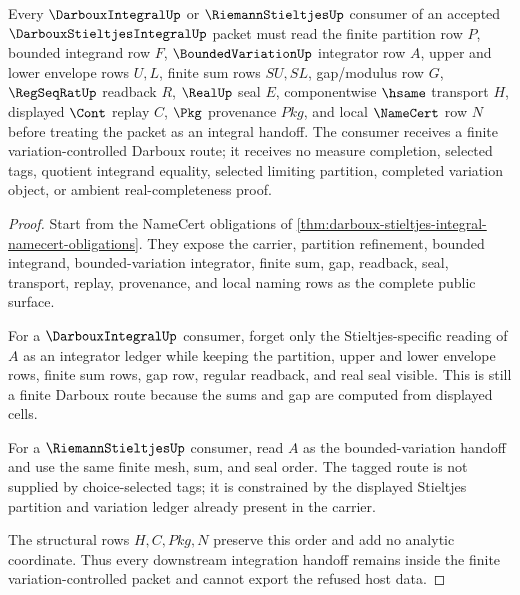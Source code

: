 \begin{theorem}
\label{thm:darboux-stieltjes-integral-variation-handoff}
Every $\DarbouxIntegralUp$ or $\RiemannStieltjesUp$ consumer of an accepted $\DarbouxStieltjesIntegralUp$ packet must read the finite partition row $P$, bounded integrand row $F$, $\BoundedVariationUp$ integrator row $A$, upper and lower envelope rows $U,L$, finite sum rows $SU,SL$, gap/modulus row $G$, $\RegSeqRatUp$ readback $R$, $\RealUp$ seal $E$, componentwise $\hsame$ transport $H$, displayed $\Cont$ replay $C$, $\Pkg$ provenance $Pkg$, and local $\NameCert$ row $N$ before treating the packet as an integral handoff. The consumer receives a finite variation-controlled Darboux route; it receives no measure completion, selected tags, quotient integrand equality, selected limiting partition, completed variation object, or ambient real-completeness proof.
\end{theorem}
\begin{proof}
Start from the NameCert obligations of \autoref{thm:darboux-stieltjes-integral-namecert-obligations}. They expose the carrier, partition refinement, bounded integrand, bounded-variation integrator, finite sum, gap, readback, seal, transport, replay, provenance, and local naming rows as the complete public surface.

For a $\DarbouxIntegralUp$ consumer, forget only the Stieltjes-specific reading of $A$ as an integrator ledger while keeping the partition, upper and lower envelope rows, finite sum rows, gap row, regular readback, and real seal visible. This is still a finite Darboux route because the sums and gap are computed from displayed cells.

For a $\RiemannStieltjesUp$ consumer, read $A$ as the bounded-variation handoff and use the same finite mesh, sum, and seal order. The tagged route is not supplied by choice-selected tags; it is constrained by the displayed Stieltjes partition and variation ledger already present in the carrier.

The structural rows $H,C,Pkg,N$ preserve this order and add no analytic coordinate. Thus every downstream integration handoff remains inside the finite variation-controlled packet and cannot export the refused host data.
\end{proof}


